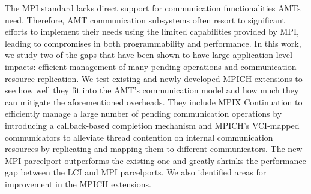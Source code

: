 The MPI standard lacks direct support for communication functionalities AMTs need. Therefore, AMT communication subsystems often resort to significant efforts to implement their needs using the limited capabilities provided by MPI, leading to compromises in both programmability and performance. In this work, we study two of the gaps that have been shown to have large application-level impacts: efficient management of many pending operations and communication resource replication. We test existing and newly developed MPICH extensions to see how well they fit into the AMT’s communication model and how much they can mitigate the aforementioned overheads. They include MPIX Continuation to efficiently manage a large number of pending communication operations by introducing a callback-based completion mechanism and MPICH’s VCI-mapped communicators to alleviate thread contention on internal communication resources by replicating and mapping them to different communicators. The new MPI parcelport outperforms the existing one and greatly shrinks the performance gap between the LCI and MPI parcelports. We also identified areas for improvement in the MPICH extensions.
